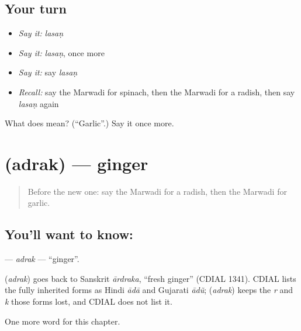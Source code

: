\subsection*{Your turn}
\begin{itemize}
\raggedright
  \item \emph{Say it:} \emph{lasaṇ}
  \item \emph{Say it:} \emph{lasaṇ}, once more
  \item \emph{Say it:} say \emph{lasaṇ}
  \item \emph{Recall:} say the Marwadi for spinach, then the Marwadi for a radish, then say \emph{lasaṇ} again
\end{itemize}

\begin{tcolorbox}[breakable,colback=teal!4,colframe=teal!35!black,title={Before you move on}]
What does  mean? (\textquotedblleft{}Garlic\textquotedblright{}.) Say it once more.
\end{tcolorbox}
\section[\texorpdfstring{\mw{अदरक} (adrak)}{अदरक (adrak)}]{ (adrak) — ginger}

\label{lesson:MW-C136-adrak}



\begin{quote}
Before the new one: say the Marwadi for a radish, then the Marwadi for garlic.
\end{quote}

\subsection*{You'll want to know: }
\textbf{} — \emph{adrak} — \textquotedblleft{}ginger\textquotedblright{}.

\begin{cousinweb}
\textbf{} (\emph{adrak}) goes back to Sanskrit \emph{ārdraka}, \textquotedblleft{}fresh ginger\textquotedblright{} (CDIAL 1341). CDIAL lists the fully inherited forms as Hindi \emph{ādā} and Gujarati \emph{ādũ}; \textbf{} (\emph{adrak}) keeps the \emph{r} and \emph{k} those forms lost, and CDIAL does not list it.
\end{cousinweb}

\begin{grammarlens}[title={What you've built}]
One more word for this chapter.
\end{grammarlens}

